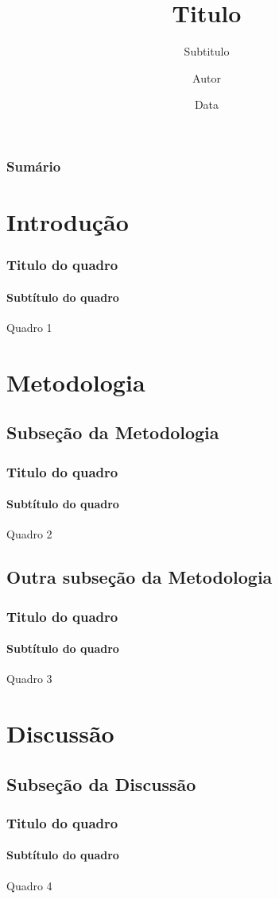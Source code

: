 \documentclass{beamer}
\title{Titulo}
\subtitle{Subtitulo}
\author[A.]{Autor}
\date{Data}
\institute[Inst.]{Intituição}
\begin{document}
\begin{frame}
	\maketitle
\end{frame}

\begin{frame}
	\frametitle{Sumário}
\end{frame}

\section[Intro]{Introdução}
\begin{frame}
	\frametitle{Titulo do quadro}
	\framesubtitle{Subtítulo do quadro}
	
	Quadro 1
\end{frame}

\section{Metodologia}
\subsection{Subseção da Metodologia}
\begin{frame}
	\frametitle{Titulo do quadro}
	\framesubtitle{Subtítulo do quadro}
	
	Quadro 2 \cite{prof_bairros_zener_2021}
\end{frame}

\subsection{Outra subseção da Metodologia}
\begin{frame}
	\frametitle{Titulo do quadro}
	\framesubtitle{Subtítulo do quadro}
	
	Quadro 3
\end{frame}

\section{Discussão}
\subsection{Subseção da Discussão}
\begin{frame}
	\frametitle{Titulo do quadro}
	\framesubtitle{Subtítulo do quadro}
	
	Quadro 4 \cite{pertencejr_2003}
\end{frame}
\end{document}
